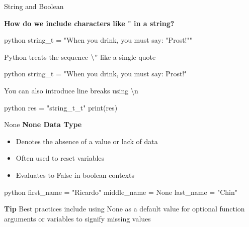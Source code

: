 \documentclass[
	11pt, 
]{beamer}
\begin{document}

\begin{frame}[fragile]{String and Boolean}

\textbf{How do we include characters like " in a string?}

\begin{mintedbox}{python}
string_t = "When you drink, you must say: "Prost!""
\end{mintedbox}

Python treats the sequence $\backslash"$ like a single quote

\begin{mintedbox}{python}
string_t = "When you drink, you must say: \"Prost!\""
\end{mintedbox}

You can also introduce line breaks using \backslash n 

\begin{mintedbox}{python}
res = "string_t\nstring_t"
print(res)
\end{mintedbox}
\end{frame}


\begin{frame}[fragile]{None}
\textbf{None Data Type}
    \begin{itemize}
        \item Denotes the absence of a value or lack of data
        \item Often used to reset variables
        \item Evaluates to False in boolean contexts
    \end{itemize}

\begin{mintedbox}{python}
first_name = "Ricardo"
middle_name = None
last_name = "Chin"
\end{mintedbox}
\begin{exampleblock}{\textbf{Tip}}
    Best practices include using None as a default value for optional function arguments or variables to signify missing values
\end{exampleblock}

\end{frame}

\end{document}

